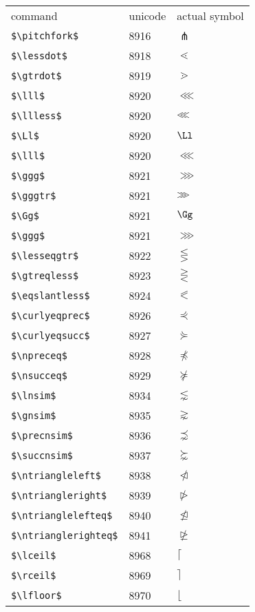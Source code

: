 \documentclass{article}
\begin{document}
\begin{table}
\begin{center}
\begin{tabular}{lll}
command & unicode & actual symbol\\
\verb#$\pitchfork$# & 8916 & $\pitchfork$\\ 
\verb#$\lessdot$# & 8918 & $\lessdot$\\ 
\verb#$\gtrdot$# & 8919 & $\gtrdot$\\ 
\verb#$\lll$# & 8920 & $\lll$\\ 
\verb#$\llless$# & 8920 & $\llless$\\ 
\verb#$\Ll$# & 8920 & $\Ll$\\ 
\verb#$\lll$# & 8920 & $\lll$\\ 
\verb#$\ggg$# & 8921 & $\ggg$\\ 
\verb#$\gggtr$# & 8921 & $\gggtr$\\ 
\verb#$\Gg$# & 8921 & $\Gg$\\ 
\verb#$\ggg$# & 8921 & $\ggg$\\ 
\verb#$\lesseqgtr$# & 8922 & $\lesseqgtr$\\ 
\verb#$\gtreqless$# & 8923 & $\gtreqless$\\ 
\verb#$\eqslantless$# & 8924 & $\eqslantless$\\ 
\verb#$\curlyeqprec$# & 8926 & $\curlyeqprec$\\ 
\verb#$\curlyeqsucc$# & 8927 & $\curlyeqsucc$\\ 
\verb#$\npreceq$# & 8928 & $\npreceq$\\ 
\verb#$\nsucceq$# & 8929 & $\nsucceq$\\ 
\verb#$\lnsim$# & 8934 & $\lnsim$\\ 
\verb#$\gnsim$# & 8935 & $\gnsim$\\ 
\verb#$\precnsim$# & 8936 & $\precnsim$\\ 
\verb#$\succnsim$# & 8937 & $\succnsim$\\ 
\verb#$\ntriangleleft$# & 8938 & $\ntriangleleft$\\ 
\verb#$\ntriangleright$# & 8939 & $\ntriangleright$\\ 
\verb#$\ntrianglelefteq$# & 8940 & $\ntrianglelefteq$\\ 
\verb#$\ntrianglerighteq$# & 8941 & $\ntrianglerighteq$\\ 
\verb#$\lceil$# & 8968 & $\lceil$\\ 
\verb#$\rceil$# & 8969 & $\rceil$\\ 
\verb#$\lfloor$# & 8970 & $\lfloor$\\ 

\end{tabular}
\end{center}
\end{table}
\end{document}
